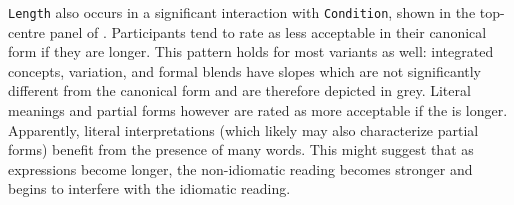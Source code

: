 \documentclass[output=paper
,modfonts
,nonflat]{langsci/langscibook}
\begin{document}
\texttt{Length} also occurs in a significant interaction with \texttt{Condition}, shown in the top-centre panel of . Participants tend to rate  as less acceptable  in their canonical form if they are longer. This pattern holds for most variants as well: integrated concepts,   variation,  and formal  blends  have slopes which are not significantly different from the canonical form and are therefore depicted in grey. Literal meanings  and partial forms  however are rated as more acceptable if the  is longer. Apparently, literal interpretations (which likely may also characterize partial forms) benefit from the presence of many words. This might suggest that as expressions become longer, the non-idiomatic reading becomes stronger and begins to interfere with the idiomatic reading.\\
\end{document}
